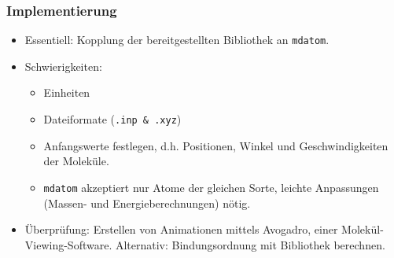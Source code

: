 \begin{frame}
  \frametitle{Implementierung}
  \begin{itemize}
    \item Essentiell: Kopplung der bereitgestellten Bibliothek an \texttt{mdatom}.
    \item Schwierigkeiten:
    \begin{itemize}
      \item Einheiten
      \item Dateiformate (\texttt{.inp \& .xyz})
      \item Anfangswerte festlegen, d.h. Positionen, Winkel und Geschwindigkeiten der Moleküle.
      \item \texttt{mdatom} akzeptiert nur Atome der gleichen Sorte, leichte Anpassungen (Massen- und Energieberechnungen) nötig.
    \end{itemize}
    \item Überprüfung: Erstellen von Animationen mittels Avogadro, einer Molekül-Viewing-Software. Alternativ: Bindungsordnung mit Bibliothek berechnen.
  \end{itemize}


\end{frame}
